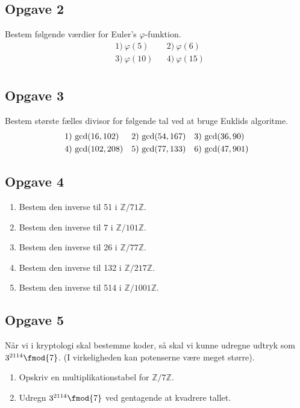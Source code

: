 \subsection*{Opgave 2}
Bestem følgende værdier for Euler's $\varphi$-funktion.
\begin{align*}
	&1) \ \varphi(5) &&2) \   \varphi(6) \\
	&3) \ \varphi(10)       &&4) \ \varphi(15) \\
\end{align*}

\subsection*{Opgave 3}
Bestem største fælles divisor for følgende tal ved at bruge Euklids algoritme.
\begin{align*}
	&1) \ \textnormal{gcd}(16,102)  &&2) \ \textnormal{gcd}(54,167)  &&3) \  \textnormal{gcd}(36,90)  \\
	&4) \ \textnormal{gcd}(102,208)  &&5) \ \textnormal{gcd}(77,133)  &&6) \ \textnormal{gcd}(47,901)   \\
\end{align*}

\subsection*{Opgave 4}
\begin{enumerate}[label=\roman*)]
	\item Bestem den inverse til 51 i $\mathbb{Z}/71\mathbb{Z}$. 
	\item Bestem den inverse til $7$ i $\mathbb{Z}/101\mathbb{Z}$.
	\item Bestem den inverse til 26 i $\mathbb{Z}/77\mathbb{Z}$.
	\item Bestem den inverse til 132 i $\mathbb{Z}/217\mathbb{Z}$.
	\item Bestem den inverse til 514 i $\mathbb{Z}/1001\mathbb{Z}$.
\end{enumerate}

\subsection*{Opgave 5}
Når vi i kryptologi skal bestemme koder, så skal vi kunne udregne udtryk som $3^{2114} \fmod{7}$. (I virkeligheden kan potenserne være meget større).
\begin{enumerate}[label=\roman*)]
	\item Opskriv en multiplikationstabel for $\mathbb{Z}/7\mathbb{Z}$. 
	\item Udregn $3^{2114} \fmod{7}$ ved gentagende at kvadrere tallet. 
\end{enumerate}
